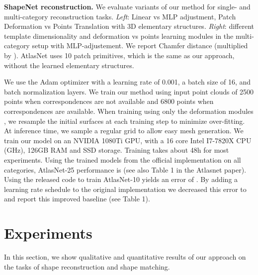 \documentclass{article}
\renewcommand{\paragraph}[1]{\noindent{\bf #1}}
\begin{document}
\begin{table}[t]
\begin{center}
\end{center}
\caption{
\textbf{ShapeNet reconstruction.} We evaluate variants of our method for single- and multi-category reconstruction tasks. \textit{Left}: Linear vs MLP adjustment, Patch Deformation vs Points Translation with 3D elementary structures. \textit{Right}: different template dimensionality and deformation vs points learning modules in the multi-category setup with MLP-adjustement. We report Chamfer distance (multiplied by ). AtlasNet uses 10 patch primitives, which is the same as our approach, without the learned elementary structures.
}

\label{tab:cat}
\vspace{-1em}
\end{table}



\paragraph{Training details.} We use the Adam optimizer with a learning rate of 0.001, a batch size of 16, and batch normalization layers. We train our method using input point clouds of 2500 points when correspondences are not available and 6800 points when correspondences are available. When training using only the deformation modules , we resample the initial surfaces  at each training step to minimize over-fitting. At inference time, we sample a regular grid to allow easy mesh generation. We train our model on an NVIDIA 1080Ti GPU, with a 16 core Intel I7-7820X CPU (GHz), 126GB RAM and SSD storage. Training takes about 48h for most experiments. Using the trained models from the official implementation on all categories,  AtlasNet-25 performance is  (see also Table 1 in the Atlasnet paper). Using the released code to train AtlasNet-10 yields an error of . By adding a learning rate schedule to the original implementation we decreased this error to  and report this improved baseline (see Table 1).
 




\vspace{-.25em}
\section{Experiments}
\vspace{-.25em}
\label{sec:results}
In this section, we show qualitative and quantitative results of our approach on the tasks of shape reconstruction and shape matching.\vspace{-1.25em}
\end{document}
